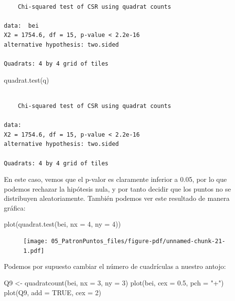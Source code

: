 \documentclass[
  letterpaper,
  DIV=11,
  numbers=noendperiod]{scrreprt}
\newenvironment{Shaded}{\begin{snugshade}}{\end{snugshade}}
\newcommand{\AttributeTok}[1]{\textcolor[rgb]{0.40,0.45,0.13}{#1}}
\newcommand{\ConstantTok}[1]{\textcolor[rgb]{0.56,0.35,0.01}{#1}}
\newcommand{\DecValTok}[1]{\textcolor[rgb]{0.68,0.00,0.00}{#1}}
\newcommand{\FloatTok}[1]{\textcolor[rgb]{0.68,0.00,0.00}{#1}}
\newcommand{\FunctionTok}[1]{\textcolor[rgb]{0.28,0.35,0.67}{#1}}
\newcommand{\NormalTok}[1]{\textcolor[rgb]{0.00,0.23,0.31}{#1}}
\newcommand{\OtherTok}[1]{\textcolor[rgb]{0.00,0.23,0.31}{#1}}
\newcommand{\StringTok}[1]{\textcolor[rgb]{0.13,0.47,0.30}{#1}}
\begin{document}
\begin{verbatim}

    Chi-squared test of CSR using quadrat counts

data:  bei
X2 = 1754.6, df = 15, p-value < 2.2e-16
alternative hypothesis: two.sided

Quadrats: 4 by 4 grid of tiles
\end{verbatim}

\begin{Shaded}
\begin{Highlighting}[]
\FunctionTok{quadrat.test}\NormalTok{(q)}
\end{Highlighting}
\end{Shaded}

\begin{verbatim}

    Chi-squared test of CSR using quadrat counts

data:  
X2 = 1754.6, df = 15, p-value < 2.2e-16
alternative hypothesis: two.sided

Quadrats: 4 by 4 grid of tiles
\end{verbatim}

En este caso, vemos que el p-valor es claramente inferior a 0.05, por lo
que podemos rechazar la hipótesis nula, y por tanto decidir que los
puntos no se distribuyen aleatoriamente. También podemos ver este
resultado de manera gráfica:

\begin{Shaded}
\begin{Highlighting}[]
\FunctionTok{plot}\NormalTok{(}\FunctionTok{quadrat.test}\NormalTok{(bei, }\AttributeTok{nx =} \DecValTok{4}\NormalTok{, }\AttributeTok{ny =} \DecValTok{4}\NormalTok{))}
\end{Highlighting}
\end{Shaded}

\begin{figure}[H]

{\centering \texttt{[image: 05\_PatronPuntos\_files/figure-pdf/unnamed-chunk-21-1.pdf]}

}

\end{figure}

Podemos por supuesto cambiar el número de cuadrículas a nuestro antojo:

\begin{Shaded}
\begin{Highlighting}[]
\NormalTok{Q9 }\OtherTok{\textless{}{-}} \FunctionTok{quadratcount}\NormalTok{(bei, }\AttributeTok{nx =} \DecValTok{3}\NormalTok{, }\AttributeTok{ny =} \DecValTok{3}\NormalTok{)}
\FunctionTok{plot}\NormalTok{(bei, }\AttributeTok{cex =} \FloatTok{0.5}\NormalTok{, }\AttributeTok{pch =} \StringTok{"+"}\NormalTok{)}
\FunctionTok{plot}\NormalTok{(Q9, }\AttributeTok{add =} \ConstantTok{TRUE}\NormalTok{, }\AttributeTok{cex =} \DecValTok{2}\NormalTok{)}
\end{Highlighting}
\end{Shaded}
\end{document}
